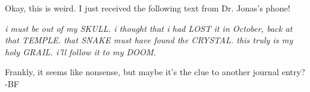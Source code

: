 Okay, this is weird. I just received the following text from Dr. Jonas's phone!

\textit{i must be out of my SKULL. i thought that i had LOST it in October,
back at that TEMPLE. that SNAKE must have found the CRYSTAL. this truly
is my holy GRAIL. i'll follow it to my DOOM.}

Frankly, it seems like nonsense, but maybe it's the clue to another
journal entry? -BF
